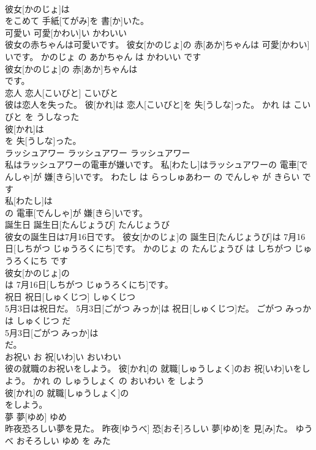\documentclass[8pt]{extreport}
\begin{document}
\begin{CJK}{UTF8}{min}
\\	彼女[かのじょ]は
\\	をこめて 手紙[てがみ]を 書[か]いた。		
\\	可愛い	可愛[かわい]い	かわいい	
\\	彼女の赤ちゃんは可愛いです。	彼女[かのじょ]の 赤[あか]ちゃんは 可愛[かわい]いです。	かのじょ の あかちゃん は かわいい です	
\\	彼女[かのじょ]の 赤[あか]ちゃんは
\\	です。		
\\	恋人	恋人[こいびと]	こいびと	
\\	彼は恋人を失った。	彼[かれ]は 恋人[こいびと]を 失[うしな]った。	かれ は こいびと を うしなった	
\\	彼[かれ]は
\\	を 失[うしな]った。		
\\	ラッシュアワー	ラッシュアワー	ラッシュアワー	
\\	私はラッシュアワーの電車が嫌いです。	私[わたし]はラッシュアワーの 電車[でんしゃ]が 嫌[きら]いです。	わたし は らっしゅあわー の でんしゃ が きらい です	
\\	私[わたし]は
\\	の 電車[でんしゃ]が 嫌[きら]いです。		
\\	誕生日	誕生日[たんじょうび]	たんじょうび	
\\	彼女の誕生日は7月16日です。	彼女[かのじょ]の 誕生日[たんじょうび]は 7月16日[しちがつ じゅうろくにち]です。	かのじょ の たんじょうび は しちがつ じゅうろくにち です	
\\	彼女[かのじょ]の
\\	は 7月16日[しちがつ じゅうろくにち]です。		
\\	祝日	祝日[しゅくじつ]	しゅくじつ	
\\	5月3日は祝日だ。	5月3日[ごがつ みっか]は 祝日[しゅくじつ]だ。	ごがつ みっか は しゅくじつ だ	
\\	5月3日[ごがつ みっか]は
\\	だ。		
\\	お祝い	お 祝[いわ]い	おいわい	
\\	彼の就職のお祝いをしよう。	彼[かれ]の 就職[しゅうしょく]のお 祝[いわ]いをしよう。	かれ の しゅうしょく の おいわい を しよう	
\\	彼[かれ]の 就職[しゅうしょく]の
\\	をしよう。		
\\	夢	夢[ゆめ]	ゆめ	
\\	昨夜恐ろしい夢を見た。	昨夜[ゆうべ] 恐[おそ]ろしい 夢[ゆめ]を 見[み]た。	ゆうべ おそろしい ゆめ を みた	

\end{CJK}
\end{document}
